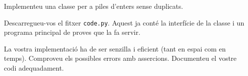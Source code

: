 

\Statement

Implementeu una classe per a piles d'enters sense duplicats.

\medskip

Descarregueu-vos el fitxer \texttt{code.py}. Aquest ja conté la interfície de la classe i un programa principal de proves que la fa servir.

\medskip

La vostra implementació ha de ser senzilla i eficient (tant en espai com en temps). Comproveu els possibles errors amb assercions. Documenteu el vostre codi adequadament.

\Sample

